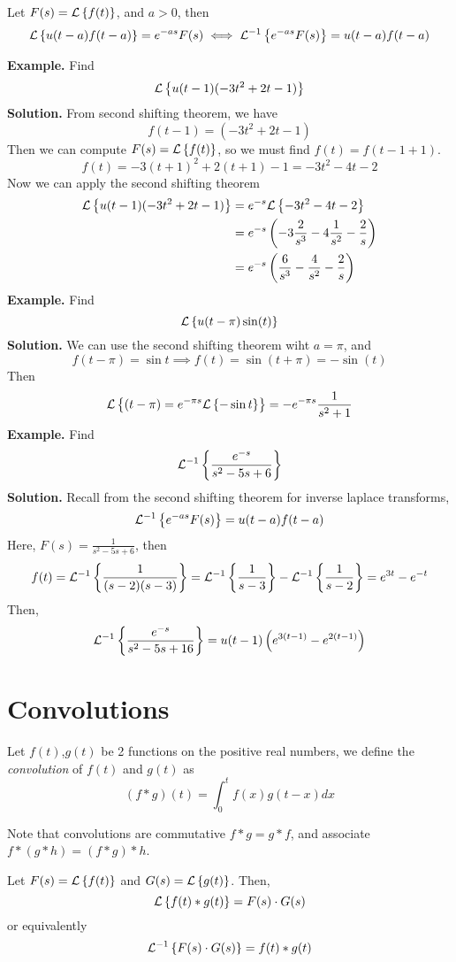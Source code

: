 \documentclass[openany]{report}
\begin{document}
\begin{theorem}
    Let $F(s) = \mathcal{L}\left\{f(t)\right\}$, and $a > 0$, then 
    \[\mathcal{L}\left\{u(t-a)f(t-a)\right\} = e^{-as}F(s) \iff \mathcal{L}^{-1}\left\{e^{-as}F(s)\right\} = u(t-a)f(t-a)\]
\end{theorem}
\noindent
\textbf{Example.} Find
\[\mathcal{L}\left\{u(t-1)(-3t^2 + 2t-1)\right\}\]
\textbf{Solution.} From second shifting theorem, we have 
\[f(t-1) = (-3t^2 + 2t - 1)\]
Then we can compute $F(s) = \mathcal{L}\left\{f(t)\right\}$, so we must find $f(t) = f(t-1+1)$.
\[f(t) = -3(t+1)^2 + 2(t+1) - 1 = -3t^2 -4t -2\]
Now we can apply the second shifting theorem 
\begin{align*}
    \mathcal{L}\left\{u(t-1)(-3t^2 + 2t - 1)\right\} &= e^{-s}\mathcal{L}\left\{-3t^2-4t-2\right\}\\
    &= e^{-s}\left(-3\frac{2}{s^3} - 4\frac{1}{s^2} - \frac{2}{s}\right)\\
    &= e^{-s}\left(\frac{6}{s^3} - \frac{4}{s^2} - \frac{2}{s}\right)
\end{align*}
\noindent
\textbf{Example.} Find 
\[\mathcal{L}\left\{u(t-\pi)\sin(t)\right\}\]
\textbf{Solution.} We can use the second shifting theorem wiht $a = \pi$, and 
\[f(t-\pi) = \sin t \implies f(t) = \sin(t + \pi) = -\sin(t)\]
Then 
\[\mathcal{L}\left\{(t-\pi) = e^{-\pi s} \mathcal{L}\left\{-\sin t\right\}\right\} = -e^{-\pi s} \frac{1}{s^2+1}\]
\noindent
\textbf{Example.} Find 
\[\mathcal{L}^{-1}\left\{\frac{e^{-s}}{s^2-5s+6}\right\}\]
\textbf{Solution.} Recall from the second shifting theorem for inverse laplace transforms, 
\[\mathcal{L}^{-1}\left\{e^{-as}F(s)\right\} = u(t-a)f(t-a)\]
Here, $F(s) = \frac{1}{s^2 - 5s + 6}$, then 
\[f(t) = \mathcal{L}^{-1}\left\{\frac{1}{(s-2)(s-3)}\right\} = \mathcal{L}^{-1}\left\{\frac{1}{s-3}\right\} - \mathcal{L}^{-1}\left\{\frac{1}{s-2}\right\} = e^{3t} - e^{-t}\]
Then, 
\[\mathcal{L}^{-1}\left\{\frac{e^{-s}}{s^2-5s+16}\right\} = u(t-1)\left(e^{3(t-1)} - e^{2(t-1)} \right)\]


\section{Convolutions}
\begin{definition}
    Let $f(t)$,$g(t)$ be 2 functions on the positive real numbers, we define the \emph{convolution} of $f(t)$ and $g(t)$ as 
    \[(f*g)(t) = \int_0^t f(x)g(t-x)dx \]
\end{definition}
Note that convolutions are commutative $f*g = g*f$, and associate $f*(g*h) = (f*g) * h$.

\begin{theorem}
    Let $F(s) = \mathcal{L}\left\{f(t)\right\}$ and $G(s) = \mathcal{L}\left\{g(t)\right\}$. Then, 
    \[\mathcal{L}\left\{f(t)*g(t)\right\} = F(s)\cdot G(s)\]
    or equivalently
    \[\mathcal{L}^{-1}\left\{F(s) \cdot G(s)\right\} = f(t)*g(t)\]
\end{theorem}
\end{document}
